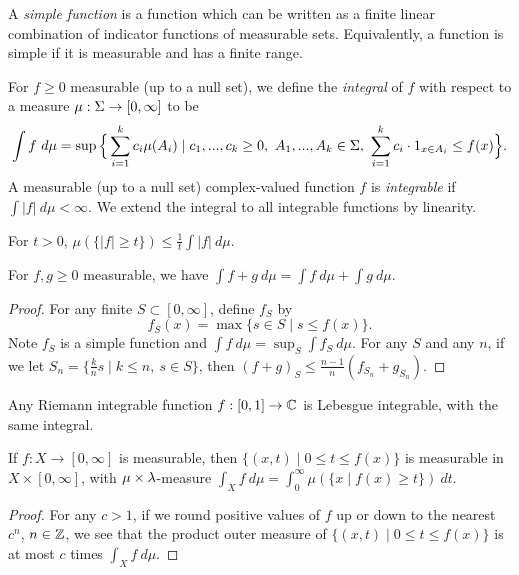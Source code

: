 \begin{defn} A \emph{simple function} is a function which can be written as a finite linear combination of indicator functions of measurable sets. Equivalently, a function is simple if it is measurable and has a finite range.
\end{defn}

\begin{defn} For $f \ge 0$ measurable (up to a null set), we define the \emph{integral} of $f$ with respect to a measure $\mu:\Sigma\rightarrow [0,\infty]$ to be
\[
\int f\ d\mu = \sup\Big\{\sum_{i = 1}^k c_i\mu(A_i) \mid c_1, ..., c_k \ge 0,\ A_1, ..., A_k \in \Sigma,\ \sum_{i=1}^k c_i\cdot 1_{x \in A_i} \le f(x)\Big\}.
\]
A measurable (up to a null set) complex-valued function $f$ is \emph{integrable} if $\int |f|\ d\mu < \infty$. We extend the integral to all integrable functions by linearity.
\end{defn}

\begin{thm}\label{markov} For $t > 0$, $\mu(\{|f| \ge t\}) \le \frac{1}{t}\int |f|\ d\mu$.
\end{thm}

\begin{prop} For $f,g \ge 0$ measurable, we have $\int f+g\ d\mu = \int f\ d\mu + \int g\ d\mu$.
\end{prop}
\begin{proof} For any finite $S \subset [0,\infty]$, define $f_S$ by
\[
f_S(x) = \max \{s \in S \mid s \le f(x)\}.
\]
Note $f_S$ is a simple function and $\int f\ d\mu = \sup_S \int f_S\ d\mu$. For any $S$ and any $n$, if we let $S_n = \{\frac{k}{n}s\mid k \le n,\ s\in S\}$, then $(f+g)_S \le \frac{n-1}{n}(f_{S_n}+g_{S_n})$.
\end{proof}

\begin{prop} Any Riemann integrable function $f:[0,1] \rightarrow \mathbb{C}$ is Lebesgue integrable, with the same integral.
\end{prop}

\begin{prop} If $f:X \rightarrow [0,\infty]$ is measurable, then $\{(x,t) \mid 0 \le t \le f(x)\}$ is measurable in $X\times [0,\infty]$, with $\mu\times\lambda$-measure $\int_X f\ d\mu = \int_0^\infty \mu(\{x \mid f(x) \ge t\})\ dt$.
\end{prop}
\begin{proof} For any $c > 1$, if we round positive values of $f$ up or down to the nearest $c^n$, $n \in \mathbb{Z}$, we see that the product outer measure of $\{(x,t) \mid 0 \le t \le f(x)\}$ is at most $c$ times $\int_X f\ d\mu$.
\end{proof}

